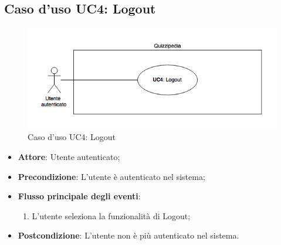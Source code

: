 \documentclass[12pt,a4paper]{article}
\begin{document}
\subsection{Caso d'uso UC4: Logout}
\begin{figure}[H]
	\centering
	\includegraphics[width=\textwidth]{diagramUC4.png}
	\caption{Caso d'uso UC4: Logout}\label{fig:UC4} 
\end{figure}
\begin{itemize}

\item \textbf{Attore}: Utente autenticato; 
\item \textbf{Precondizione}: L'utente è autenticato nel sistema;

\item \textbf{Flusso principale degli eventi}:
\begin{enumerate}
	\item L'utente seleziona la funzionalità di Logout;
	
\end{enumerate}
\item \textbf{Postcondizione}: L'utente non è più autenticato nel sistema.
\end{itemize}
\hypertarget{UC5}{}
\end{document}
